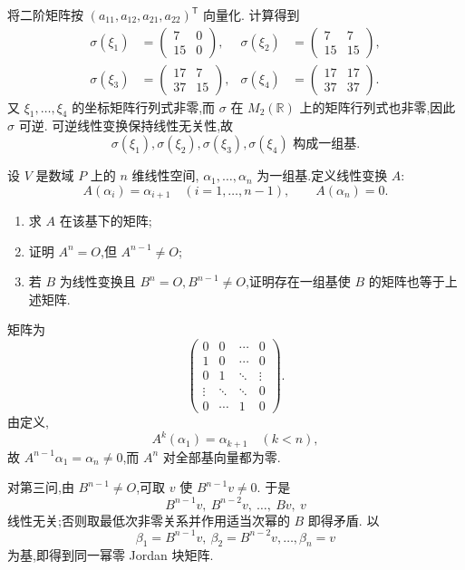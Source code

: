 \begin{solution}
将二阶矩阵按 $(a_{11},a_{12},a_{21},a_{22})^{\mathsf T}$ 向量化.
计算得到
\[
\begin{aligned}
\sigma(\xi_1)&=
\begin{pmatrix}7&0\\15&0\end{pmatrix},&
\sigma(\xi_2)&=
\begin{pmatrix}7&7\\15&15\end{pmatrix},\\
\sigma(\xi_3)&=
\begin{pmatrix}17&7\\37&15\end{pmatrix},&
\sigma(\xi_4)&=
\begin{pmatrix}17&17\\37&37\end{pmatrix}.
\end{aligned}
\]
又 $\xi_1,\ldots,\xi_4$ 的坐标矩阵行列式非零,而 $\sigma$ 在
$M_2(\mathbb{R})$ 上的矩阵行列式也非零,因此 $\sigma$ 可逆.
可逆线性变换保持线性无关性,故
\[
\boxed{\sigma(\xi_1),\sigma(\xi_2),\sigma(\xi_3),\sigma(\xi_4)
\text{ 构成一组基}.}
\]
\end{solution}


\begin{example}
设 $V$ 是数域 $P$ 上的 $n$ 维线性空间,
$\alpha_1,\ldots,\alpha_n$ 为一组基.定义线性变换 $A$:
\[
A(\alpha_i)=\alpha_{i+1}\quad(i=1,\ldots,n-1),
\qquad
A(\alpha_n)=0.
\]
\begin{enumerate}
    \item 求 $A$ 在该基下的矩阵;
    \item 证明 $A^n=O$,但 $A^{n-1}\neq O$;
    \item 若 $B$ 为线性变换且 $B^n=O,B^{n-1}\neq O$,证明存在一组基使 $B$ 的矩阵也等于上述矩阵.
\end{enumerate}
\end{example}
\exampleblank

\begin{solution}
矩阵为
\[
\boxed{
\begin{pmatrix}
0&0&\cdots&0\\
1&0&\cdots&0\\
0&1&\ddots&\vdots\\
\vdots&\ddots&\ddots&0\\
0&\cdots&1&0
\end{pmatrix}
}.
\]
由定义,
\[
A^k(\alpha_1)=\alpha_{k+1}\quad(k<n),
\]
故 $A^{n-1}\alpha_1=\alpha_n\neq0$,而 $A^n$ 对全部基向量都为零.

对第三问,由 $B^{n-1}\neq O$,可取 $v$ 使 $B^{n-1}v\neq0$.
于是
\[
B^{n-1}v,\ B^{n-2}v,\ \ldots,\ Bv,\ v
\]
线性无关;否则取最低次非零关系并作用适当次幂的 $B$ 即得矛盾.
以
\[
\beta_1=B^{n-1}v,\ \beta_2=B^{n-2}v,\ldots,\beta_n=v
\]
为基,即得到同一幂零 Jordan 块矩阵.
\end{solution}


